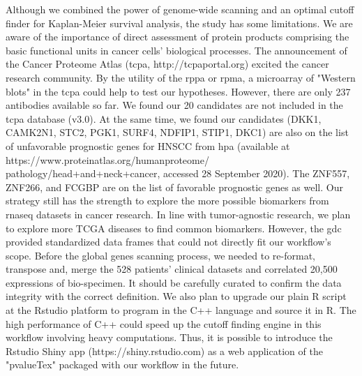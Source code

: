 \documentclass[cancers,article,submit,moreauthors,pdftex]{Definitions/mdpi}
\begin{document}
\begin{paracol}{2}
Although we combined the power of genome-wide scanning and an optimal cutoff finder for Kaplan-Meier survival analysis, the study has some limitations. We are aware of the importance of direct assessment of protein products comprising the basic functional units in cancer cells' biological processes. The announcement of the Cancer Proteome Atlas (\acrshort{tcpa}, http://tcpaportal.org) excited the cancer research community\cite{Li2013c}\cite{Li2017b}. By the utility of the \acrfull{rppa} or \acrfull{rpma}, a microarray of "Western blots" in the \acrshort{tcpa} could help to test our hypotheses.
However, there are only 237 antibodies available so far. We found our 20 candidates are not included in the \acrshort{tcpa} database (v3.0\cite{Chen2019}).
At the same time, we found our candidates (DKK1, CAMK2N1, STC2, PGK1, SURF4, NDFIP1, STIP1, DKC1) are also on the list of unfavorable prognostic genes for HNSCC from \acrfull{hpa}
(available at https://www.proteinatlas.org/humanproteome/\newline
pathology/head+and+neck+cancer, accessed 28 September 2020). The ZNF557, ZNF266, and FCGBP are on the list of favorable prognostic genes as well.
Our strategy still has the strength to explore the more possible biomarkers from \acrshort{rnaseq} datasets in cancer research.
In line with tumor-agnostic research, we plan to explore more TCGA diseases to find common biomarkers. However, the \acrshort{gdc} provided standardized data frames that could not directly fit our workflow's scope. Before the global genes scanning process, we needed to re-format, transpose and, merge the 528 patients' clinical datasets and correlated 20,500 expressions of bio-specimen. It should be carefully curated to confirm the data integrity with the correct definition. We also plan to upgrade our plain R script at the Rstudio platform to program in the C++ language and source it in R. The high performance of C++ could speed up the cutoff finding engine in this workflow involving heavy computations\cite{Woodward2020}. Thus, it is possible to introduce the Rstudio Shiny app (https://shiny.rstudio.com) as a web application of the "pvalueTex" packaged with our workflow in the future.





\end{paracol}
\end{document}

